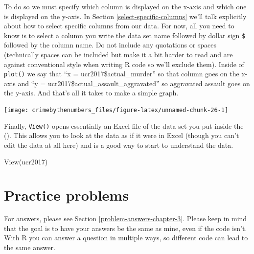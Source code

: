 \documentclass[
]{krantz}
\makeatletter
\newenvironment{Shaded}{\begin{snugshade}}{\end{snugshade}}
\newcommand{\AttributeTok}[1]{\textcolor[rgb]{0.61,0.61,0.61}{#1}}
\newcommand{\FunctionTok}[1]{\textcolor[rgb]{0,0,0}{#1}}
\newcommand{\NormalTok}[1]{#1}
\newcommand{\SpecialCharTok}[1]{\textcolor[rgb]{0,0,0}{#1}}
\newenvironment{kframe}{%
\medskip{}
\setlength{\fboxsep}{.8em}
 \def\at@end@of@kframe{}%
 \ifinner\ifhmode%
  \def\at@end@of@kframe{\end{minipage}}%
  \begin{minipage}{\columnwidth}%
 \fi\fi%
 \def\FrameCommand##1{\hskip\@totalleftmargin \hskip-\fboxsep
 \colorbox{shadecolor}{##1}\hskip-\fboxsep
     \hskip-\linewidth \hskip-\@totalleftmargin \hskip\columnwidth}%
 \MakeFramed {\advance\hsize-\width
   \@totalleftmargin\z@ \linewidth\hsize
   \@setminipage}}%
 {\par\unskip\endMakeFramed%
 \at@end@of@kframe}
\renewenvironment{Shaded}{\begin{kframe}}{\end{kframe}}
\makeatother
\begin{document}
To do so we must specify which column is displayed on the x-axis and which one is displayed on the y-axis. In Section \ref{select-specific-columns} we'll talk explicitly about how to select specific columns from our data. For now, all you need to know is to select a column you write the data set name followed by dollar sign \texttt{\$} followed by the column name. Do not include any quotations or spaces (technically spaces can be included but make it a bit harder to read and are against conventional style when writing R code so we'll exclude them). Inside of \texttt{plot()} we say that ``x = ucr2017\$actual\_murder'' so that column goes on the x-axis and ``y = ucr2017\$actual\_assault\_aggravated'' so aggravated assault goes on the y-axis. And that's all it takes to make a simple graph.

\begin{Shaded}
\end{Shaded}

\begin{center}\texttt{[image: crimebythenumbers\_files/figure-latex/unnamed-chunk-26-1]} \end{center}

Finally, \texttt{View()} opens essentially an Excel file of the data set you put inside the (). This allows you to look at the data as if it were in Excel (though you can't edit the data at all here) and is a good way to start to understand the data.

\begin{Shaded}
\begin{Highlighting}[]
\FunctionTok{View}\NormalTok{(ucr2017)}
\end{Highlighting}
\end{Shaded}

\hypertarget{practice-problems-1}{%
\section{Practice problems}\label{practice-problems-1}}

For answers, please see Section \ref{problem-answers-chapter-3}. Please keep in mind that the goal is to have your answers be the same as mine, even if the code isn't. With R you can answer a question in multiple ways, so different code can lead to the same answer.
\end{document}
